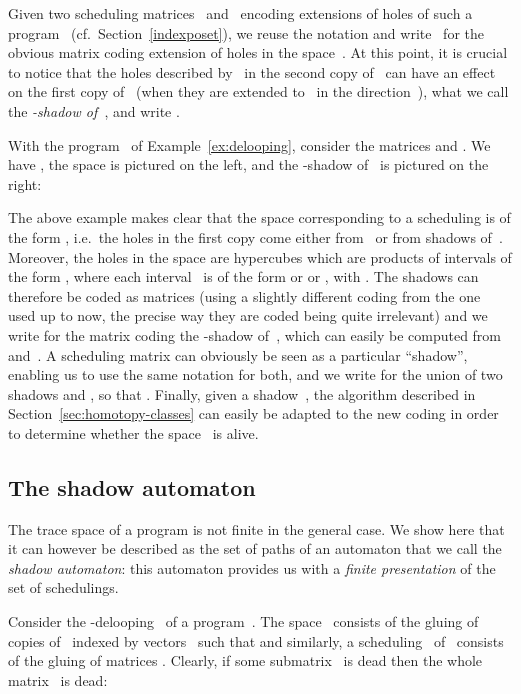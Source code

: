 \documentclass[orivec]{llncs} \usepackage[T1]{fontenc}
\newcommand{\ie}{i.e.~}
\newcommand{\cf}{cf.~}
\begin{document}
\newcommand{\shadow}[2]{#2|_{#1}}

Given two scheduling matrices~ and~ encoding extensions of holes of such a
program~ (\cf Section~\ref{indexposet}), we reuse the notation and
write~ for the obvious matrix coding extension of holes in the
space~. At this point, it is crucial to notice that the holes
described by~ in the second copy of~ can have an effect on the first
copy of~ (when they are extended to~ in the direction~), what we call
the \emph{-shadow of~}, and write .

\begin{example}
  With the program~ of Example~\ref{ex:delooping}, consider the matrices
   and
  . We have , the space  is pictured on the left, and the -shadow  of~ is
  pictured on the right:
  
\end{example}

The above example makes clear that the space corresponding to a scheduling
 is of the form , \ie the holes in the first copy come either from~ or from shadows
of~. Moreover, the holes in the space  are hypercubes which
are products of intervals of the form , where each
interval~ is of the form  or  or ,
with . The shadows can therefore be coded as matrices (using a
slightly different coding from the one used up to now, the precise way they are
coded being quite irrelevant) and we write  for the matrix coding
the -shadow of~, which can easily be computed from~ and~. A
scheduling matrix  can obviously be seen as a particular ``shadow'', enabling
us to use the same notation for both, and we write  for the union of
two shadows  and , so that . Finally, given a
shadow~, the algorithm described in Section~\ref{sec:homotopy-classes} can
easily be adapted to the new coding in order to determine whether the
space~ is alive.

\subsection{The shadow automaton}
The trace space of a program  is not finite in the general case. We show
here that it can however be described as the set of paths of an automaton that
we call the \emph{shadow automaton}: this automaton provides us with a
\emph{finite presentation} of the set of schedulings.

Consider the -delooping~ of a program~. The space~ consists
of the gluing of copies of~ indexed by vectors~ such that 
and similarly, a scheduling~ of~ consists of the gluing of matrices
. Clearly, if some submatrix~ is dead then the whole matrix~ is
dead:
\end{document}
